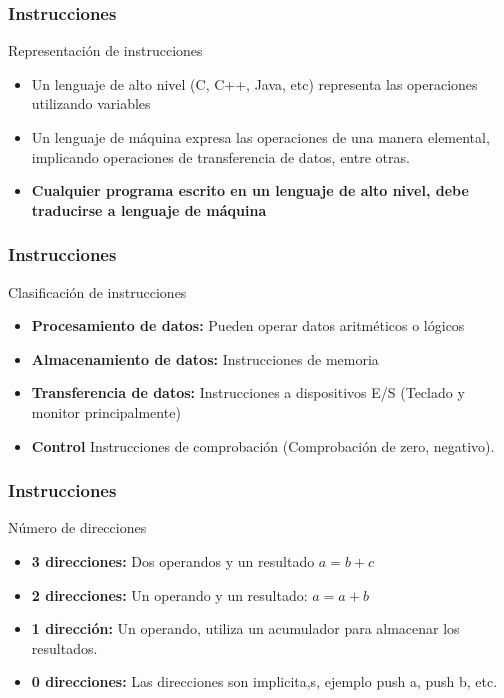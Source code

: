 \documentclass{beamer}
\begin{document}
\begin{frame}
		\frametitle{Instrucciones}
		\begin{block}{Representación de instrucciones}
		\begin{itemize}
			\item Un lenguaje de alto nivel (C, C++, Java, etc) representa las operaciones utilizando variables
			\item Un lenguaje de máquina expresa las operaciones de una manera elemental, implicando operaciones de transferencia de datos, entre otras.
			\item \textbf{Cualquier programa escrito en un lenguaje de alto nivel, debe traducirse a lenguaje de máquina}
		\end{itemize}
	\end{block}		 		
\end{frame}

\begin{frame}
		\frametitle{Instrucciones}
		\begin{block}{Clasificación de instrucciones}
		\begin{itemize}
			\item \textbf{Procesamiento de datos:} Pueden operar datos aritméticos o lógicos
			\item \textbf{Almacenamiento de datos:} Instrucciones de memoria
			\item \textbf{Transferencia de datos:} Instrucciones a dispositivos E/S (Teclado y monitor principalmente)
			\item \textbf{Control} Instrucciones de comprobación (Comprobación de zero, negativo).			
		\end{itemize}
	\end{block}		 		
\end{frame}


\begin{frame}[fragile]
		\frametitle{Instrucciones}
		\begin{block}{Número de direcciones}
		\begin{itemize}
			\item \textbf{3 direcciones:} Dos operandos y un resultado $ a = b + c$
			\item \textbf{2 direcciones:} Un operando y un resultado: $a = a + b$
			\item \textbf{1 dirección:} Un operando, utiliza un acumulador para almacenar los resultados.
			\item \textbf{0 direcciones:} Las direcciones son implicita,s, ejemplo push a, push b, etc.
		\end{itemize}
	\end{block}		 		
\end{frame}
\end{document}
